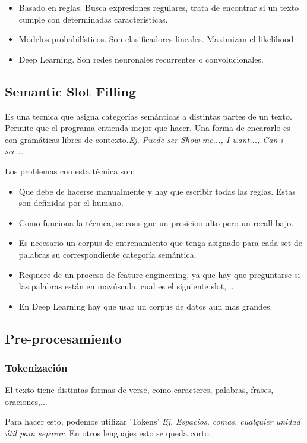 \documentclass[titlepage,a4paper]{article}
\begin{document}
\begin{itemize}
    \item Basado en reglas. Busca expresiones regulares, trata de encontrar si un texto cumple con determinadas características.
    \item Modelos probabilísticos. Son clasificadores lineales. Maximizan el likelihood
    \item Deep Learning. Son redes neuronales recurrentes o convolucionales.
\end{itemize}

\subsection{Semantic Slot Filling}
Es una tecnica que asigna categorías semánticas a distintas partes de un texto. Permite que el programa entienda mejor que hacer. Una forma de encararlo es con gramáticas libres de contexto.\textit{Ej. Puede ser Show me..., I want..., Can i see... }.

Los problemas con esta técnica son:
\begin{itemize}
\item Que debe de hacerse manualmente y hay que escribir todas las reglas. Estas son definidas por el humano.
\item Como funciona la técnica, se consigue un presicion alto pero un recall bajo. 
\item Es necesario un corpus de entrenamiento que tenga asignado para cada set de palabras su correspondiente categoría semántica.
\item Requiere de un proceso de feature engineering, ya que hay que preguntarse si las palabras están en mayúscula, cual es el siguiente slot, ...
\item En Deep Learning hay que usar un corpus de datos aun mas grandes.
\end{itemize}

\subsection{Pre-procesamiento}
\subsubsection*{Tokenización}
El texto tiene distintas formas de verse, como caracteres, palabras, frases, oraciones,...

Para hacer esto, podemos utilizar 'Tokens' \textit{Ej. Espacios, comas, cualquier unidad útil para separar}. En otros lenguajes esto se queda corto.
\end{document}
